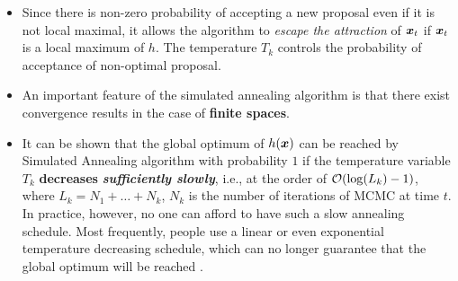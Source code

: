 \documentclass[11pt]{article}
\begin{document}
\begin{itemize}
\item  Since there is non-zero probability of accepting a new proposal even if it is not local maximal, it allows the algorithm to \emph{escape the attraction} of $\boldsymbol{x}_t$ if $\boldsymbol{x}_t$ is a local maximum of $h$. The temperature $T_{k}$ controls the probability of acceptance of non-optimal proposal.

\item An important feature of the simulated annealing algorithm is that there exist convergence results in the case of \textbf{finite spaces}. \citep{robert1999monte}

\item It can be shown that the global optimum of $h(\boldsymbol{x})$ can be reached by Simulated Annealing algorithm with probability $1$ if the temperature variable $T_k$ \textbf{decreases} \emph{\textbf{sufficiently slowly}}, i.e., at the order of ${\mathcal O}(\log(L_k)-1)$, where $L_k = N_1 +\ldots + N_k$, $N_k$ is the number of iterations of MCMC at time $t$. In practice, however, no one can afford to have such a slow annealing schedule. Most frequently, people use a linear or even exponential temperature decreasing schedule, which can no longer guarantee that the global optimum will be reached \citep{liu2001monte}. 
\end{itemize}
\end{document}
